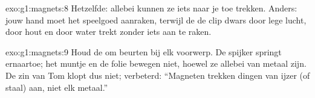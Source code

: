 \begin{solution}{exo:g1:magnets:8}
Hetzelfde: allebei kunnen ze iets naar je toe trekken. Anders: jouw
hand moet het speelgoed aanraken, terwijl de  de clip dwars
door lege lucht, door hout en door water trekt zonder iets aan te
raken.
\end{solution}

\begin{solution}{exo:g1:magnets:9}
Houd de  om beurten bij elk voorwerp. De spijker springt
ernaartoe; het muntje en de folie bewegen niet, hoewel ze allebei van
metaal zijn. De zin van Tom klopt dus niet; verbeterd: ``Magneten
trekken dingen van ijzer (of staal) aan, niet elk metaal.''
\end{solution}
